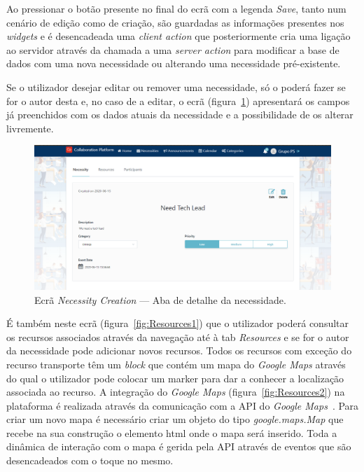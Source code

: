 Ao pressionar o botão presente no final do ecrã com a legenda \textit{Save}, tanto num cenário de edição como de criação, 
são guardadas as informações presentes nos \textit{widgets} e é desencadeada uma \textit{client action} que posteriormente cria uma ligação ao servidor através da chamada a uma \textit{server action} para modificar a base de dados com uma nova necessidade ou alterando uma necessidade pré-existente.

Se o utilizador desejar editar ou remover uma necessidade, só o poderá fazer se for o autor desta e, no caso de a editar, o ecrã (figura~\ref{fig:NecessityCreationWithResourcesAndParticipants}) apresentará os campos já preenchidos com os dados atuais da necessidade e a possibilidade de os alterar livremente.

\begin{figure}[H]
  \centering 
  \includegraphics[scale=0.4]{figures/NecessityCreationWithResourcesAndParticipants.png}
  \caption{Ecrã \textit{Necessity Creation} --- Aba de detalhe da necessidade.}\label{fig:NecessityCreationWithResourcesAndParticipants}
\end{figure}


É também neste ecrã (figura~\ref{fig:Resources1}) que o utilizador poderá consultar os recursos associados através da navegação até à tab \textit{Resources} e se for o autor da necessidade pode adicionar novos recursos. 
Todos os recursos com exceção do recurso transporte têm um \textit{block} que contém um mapa do \textit{Google Maps} através do qual o utilizador pode colocar um marker para dar a conhecer a localização associada ao recurso. 
A integração do \textit{Google Maps} (figura~\ref{fig:Resources2}) na plataforma é realizada através da comunicação com a API do \textit{Google Maps}~\cite{google maps api}. Para criar um novo mapa é necessário criar um objeto do tipo \textit{google.maps.Map} que recebe na sua construção o elemento html onde o mapa será inserido. 
Toda a dinâmica de interação com o mapa é gerida pela API através de eventos que são desencadeados com o toque no mesmo. 

